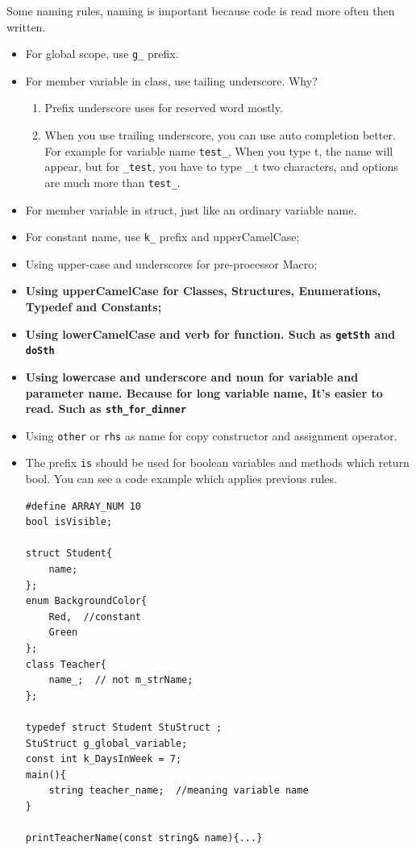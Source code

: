\documentclass[a4paper,11pt,twoside]{book}
\begin{document}
Some naming rules, naming is important because code is read more often then written. 
\begin{itemize}
	
	\item For global scope, use \texttt{g\_} prefix.
	
	\item For member variable in class, use tailing underscore. Why? 
	\begin{enumerate}
		\item Prefix underscore uses for reserved word mostly.
		\item When you use trailing underscore, you can use auto completion better. For example for variable name \texttt{test\_}, When you type t, the name will appear, but for \texttt{\_test}, you have to type \_t two characters, and options are much more than \texttt{test\_}.
	\end{enumerate}
	
	\item For member variable in struct, just like an ordinary variable name. 
	
	\item For constant name, use \texttt{k\_} prefix and upperCamelCase;
	
	\item Using upper-case and underscores for pre-processor Macro;
	
	\item \textbf{Using upperCamelCase for Classes, Structures, Enumerations, Typedef and  Constants;}
	
	\item \textbf{Using lowerCamelCase and verb for function. Such as \texttt{getSth} and \texttt{doSth}}
	
	\item \textbf{Using lowercase and underscore  and noun for variable and parameter name. Because for long variable name, It's easier to read. Such as \texttt{sth\_for\_dinner}}
	
	\item Using \texttt{other} or \texttt{rhs} as name for copy constructor and assignment operator.
	
	\item The prefix \texttt{is} should be used for boolean variables and methods which return bool. You can see a code example which applies previous rules.
	
\begin{lstlisting}[numbers=none]
#define ARRAY_NUM 10
bool isVisible;

struct Student{
	name;
};
enum BackgroundColor{
	Red,  //constant
	Green
};
class Teacher{
	name_;  // not m_strName;  
};

typedef struct Student StuStruct ;
StuStruct g_global_variable;
const int k_DaysInWeek = 7;
main(){
	string teacher_name;  //meaning variable name
}

printTeacherName(const string& name){...}
\end{lstlisting}
\end{itemize}
\end{document}

